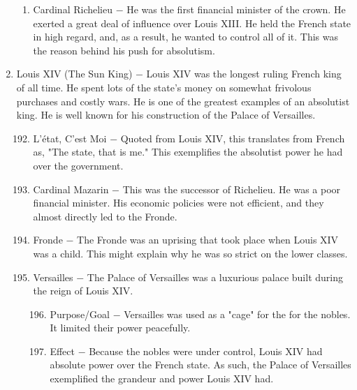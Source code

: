 \documentclass[12pt]{article}
\begin{document}
\begin{enumerate}
\begin{enumerate}[label=\arabic{*}.]
\item Cardinal Richelieu $-$ He was the first financial minister of the crown. He exerted a great deal of influence over Louis XIII. He held the French state in high regard, and, as a result, he wanted to control all of it. This was the reason behind his push for absolutism.

\end{enumerate}
\setcounter{enumi}{190}

\item Louis XIV (The Sun King) $-$ Louis XIV was the longest ruling French king of all time. He spent lots of the state's money on somewhat frivolous purchases and costly wars. He is one of the greatest examples of an absolutist king. He is well known for his construction of the Palace of Versailles.

\begin{enumerate}[label=\arabic{*}.]
\setcounter{enumii}{191}
\item L'\'etat, C'est Moi $-$ Quoted from Louis XIV, this translates from French as, "The state, that is me." This exemplifies the absolutist power he had over the government.

\item Cardinal Mazarin $-$ This was the successor of Richelieu. He was a poor financial minister. His economic policies were not efficient, and they almost directly led to the Fronde.

\item Fronde $-$ The Fronde was an uprising that took place when Louis XIV was a child. This might explain why he was so strict on the lower classes.

\item Versailles $-$ The Palace of Versailles was a luxurious palace built during the reign of Louis XIV.

\begin{enumerate}[label=\arabic{*}.]
\setcounter{enumiii}{195}

\item Purpose/Goal $-$ Versailles was used as a "cage" for the for the nobles. It limited their power peacefully.

\item Effect $-$ Because the nobles were under control, Louis XIV had absolute power over the French state. As such, the Palace of Versailles exemplified the grandeur and power Louis XIV had.

\end{enumerate}
\setcounter{enumii}{197}


\end{enumerate}
\end{enumerate}
\end{document}
